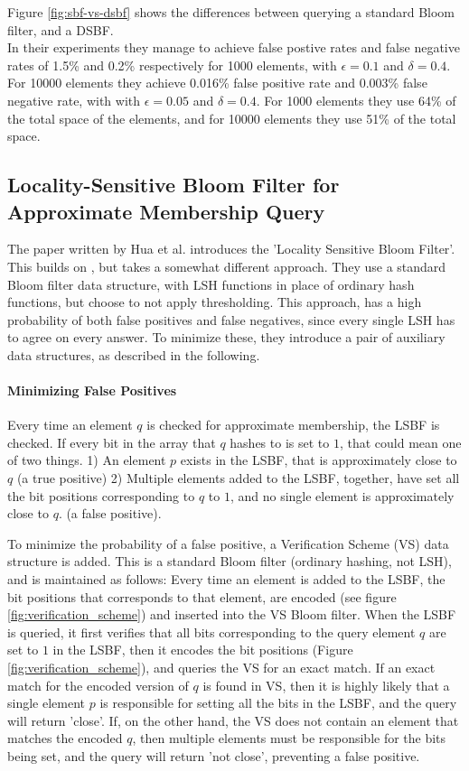 \documentclass[a4paper,11pt]{article}
\begin{document}
Figure \ref{fig:sbf-vs-dsbf} shows the differences between querying a standard Bloom filter, and a DSBF.\\

In their experiments they manage to achieve false postive rates and false negative rates of 1.5\% and 0.2\% respectively for 1000 elements, with $\epsilon = 0.1$ and $\delta = 0.4$. For 10000 elements they achieve 0.016\% false positive rate and 0.003\% false negative rate, with with $\epsilon = 0.05$ and $\delta = 0.4$. For 1000 elements they use 64\% of the total space of the elements, and for 10000 elements they use 51\% of the total space.

\subsection{Locality-Sensitive Bloom Filter for Approximate Membership Query}
The paper written by Hua et al.\cite{paper:hua} introduces the 'Locality Sensitive Bloom Filter'. This builds on \cite{paper:harvard}, but takes a somewhat different approach. They use a standard Bloom filter data structure, with LSH functions in place of ordinary hash functions, but choose to not apply thresholding. This approach, has a high probability of both false positives and false negatives, since every single LSH has to agree on every answer. To minimize these, they introduce a pair of auxiliary data structures, as described in the following.

\paragraph{Minimizing False Positives}
Every time an element $q$ is checked for approximate membership, the LSBF is checked. If every bit in the array that $q$ hashes to is set to $1$, that could mean one of two things.
1) An element $p$ exists in the LSBF, that is approximately close to $q$ (a true positive)
2) Multiple elements added to the LSBF, together, have set all the bit positions corresponding to $q$ to $1$, and no single element is approximately close to $q$. (a false positive).

To minimize the probability of a false positive, a Verification Scheme (VS) data structure is added.
This is a standard Bloom filter (ordinary hashing, not LSH), and is maintained as follows: Every time an element is added to the LSBF, the bit positions that corresponds to that element, are encoded (see figure \ref{fig:verification_scheme}) and inserted into the VS Bloom filter.
When the LSBF is queried, it first verifies that all bits corresponding to the query element $q$ are set to $1$ in the LSBF, then it encodes the bit positions (Figure \ref{fig:verification_scheme}), and queries the VS for an exact match. If an exact match for the encoded version of $q$ is found in VS, then it is highly likely that a single element $p$ is responsible for setting all the bits in the LSBF, and the query will return 'close'. If, on the other hand, the VS does not contain an element that matches the encoded $q$, then multiple elements must be responsible for the bits being set, and the query will return 'not close', preventing a false positive.
\end{document}

